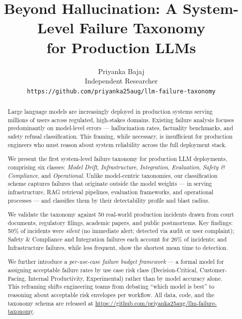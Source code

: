 \documentclass{article}
\title{Beyond Hallucination: A System-Level Failure Taxonomy\\
       for Production LLMs}
\author{%
  Priyanka Bajaj \\
  Independent Researcher \\
  \texttt{https://github.com/priyanka25aug/llm-failure-taxonomy}
}
\begin{document}
\maketitle

\begin{abstract}
Large language models are increasingly deployed in production systems serving
millions of users across regulated, high-stakes domains.  Existing failure
analysis focuses predominantly on model-level errors --- hallucination rates,
factuality benchmarks, and safety refusal classification.  This framing, while
necessary, is insufficient for production engineers who must reason about
system reliability across the full deployment stack.

We present the first system-level failure taxonomy for production LLM
deployments, comprising six classes: \emph{Model Drift}, \emph{Infrastructure},
\emph{Integration}, \emph{Evaluation}, \emph{Safety \& Compliance}, and
\emph{Operational}.  Unlike model-centric taxonomies, our classification scheme
captures failures that originate outside the model weights --- in serving
infrastructure, RAG retrieval pipelines, evaluation frameworks, and operational
processes --- and classifies them by their detectability profile and blast
radius.

We validate the taxonomy against 50 real-world production incidents drawn from
court documents, regulatory filings, academic papers, and public postmortems.
Key findings: 50\% of incidents were \emph{silent} (no immediate alert; detected
via audit or user complaint); Safety \& Compliance and Integration failures each
account for 26\% of incidents; and Infrastructure failures, while less frequent,
show the shortest mean time to detection.

We further introduce a \emph{per-use-case failure budget framework} --- a
formal model for assigning acceptable failure rates by use case risk class
(Decision-Critical, Customer-Facing, Internal Productivity, Experimental) rather
than by model accuracy alone.  This reframing shifts engineering teams from
debating ``which model is best'' to reasoning about acceptable risk envelopes
per workflow.  All data, code, and the taxonomy schema are released at
\url{https://github.com/priyanka25aug/llm-failure-taxonomy}.
\end{abstract}

\end{document}
